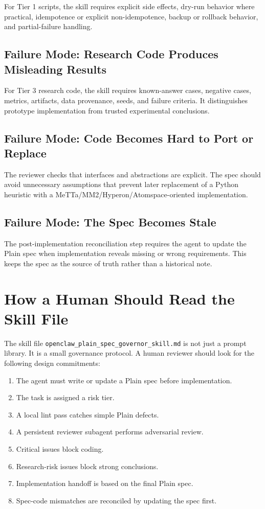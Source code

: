 \documentclass[11pt]{article}
\begin{document}
For Tier 1 scripts, the skill requires explicit side effects, dry-run behavior
where practical, idempotence or explicit non-idempotence, backup or rollback
behavior, and partial-failure handling.

\subsection{Failure Mode: Research Code Produces Misleading Results}

For Tier 3 research code, the skill requires known-answer cases, negative cases,
metrics, artifacts, data provenance, seeds, and failure criteria. It distinguishes
prototype implementation from trusted experimental conclusions.

\subsection{Failure Mode: Code Becomes Hard to Port or Replace}

The reviewer checks that interfaces and abstractions are explicit. The spec
should avoid unnecessary assumptions that prevent later replacement of a Python
heuristic with a MeTTa/MM2/Hyperon/Atomspace-oriented implementation.

\subsection{Failure Mode: The Spec Becomes Stale}

The post-implementation reconciliation step requires the agent to update the
Plain spec when implementation reveals missing or wrong requirements. This keeps
the spec as the source of truth rather than a historical note.

\section{How a Human Should Read the Skill File}

The skill file \texttt{openclaw\_plain\_spec\_governor\_skill.md} is not just a
prompt library. It is a small governance protocol. A human reviewer should look
for the following design commitments:

\begin{enumerate}[nosep]
\item The agent must write or update a Plain spec before implementation.
\item The task is assigned a risk tier.
\item A local lint pass catches simple Plain defects.
\item A persistent reviewer subagent performs adversarial review.
\item Critical issues block coding.
\item Research-risk issues block strong conclusions.
\item Implementation handoff is based on the final Plain spec.
\item Spec-code mismatches are reconciled by updating the spec first.
\end{enumerate}
\end{document}
